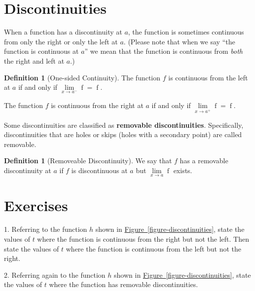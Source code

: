 \documentclass[12pt,]{book}
\newcommand{\terminology}[1]{\textbf{#1}}
\theoremstyle{plain}
\theoremstyle{definition}
\newtheorem{definition}[theorem]{Definition}
\numberwithin{equation}{section}
\providecommand\phantomsection{}
\newcommand{\fe}[2]{\mathop{{#1}{\left(#2\right)}}}
\begin{document}
\section[Discontinuities]{Discontinuities}\label{section-discontinuities}
When a function has a discontinuity at \(a\), the function is sometimes continuous from only the right or only the left at \(a\). (Please note that when we say ``the function is continuous at \(a\)'' we mean that the function is continuous from \emph{both} the right and left at \(a\).)%
\begin{definition}[One-sided Continuity]\label{definition-4}
The function \(f\) is continuous from the left at \(a\) if and only if \(\lim\limits_{x\to a^{-}}\fe{f}{x}=\fe{f}{a}\).%
\par
The function \(f\) is continuous from the right at \(a\) if and only if \(\lim\limits_{x\to a^{+}}\fe{f}{x}=\fe{f}{a}\).%
\end{definition}
\par
Some discontinuities are classified as \terminology{removable discontinuities}. Specifically, discontinuities that are holes or skips (holes with a secondary point) are called removable.%
\begin{definition}[Removeable Discontinuity]\label{definition-5}
We say that \(f\) has a removable discontinuity at \(a\) if \(f\) is discontinuous at \(a\) but \(\lim\limits_{x\to a}\fe{f}{x}\) exists.%
\end{definition}
\typeout{************************************************}
\typeout{************************************************}
\section*{Exercises}\label{exercises-13}

\begin{exerciselist}
\item[1.]\phantomsection\hypertarget{exercise-94}{\null}Referring to the function \(h\) shown in \hyperref[figure-discontinuities]{Figure~\ref*{figure-discontinuities}}, state the values of \(t\) where the function is continuous from the right but not the left. Then state the values of \(t\) where the function is continuous from the left but not the right.%
\par\smallskip
\item[2.]\phantomsection\hypertarget{exercise-95}{\null}Referring again to the function \(h\) shown in \hyperref[figure-discontinuities]{Figure~\ref*{figure-discontinuities}}, state the values of \(t\) where the function has removable discontinuities.%
\par\smallskip
\end{exerciselist}
\typeout{************************************************}
\typeout{************************************************}
\end{document}
